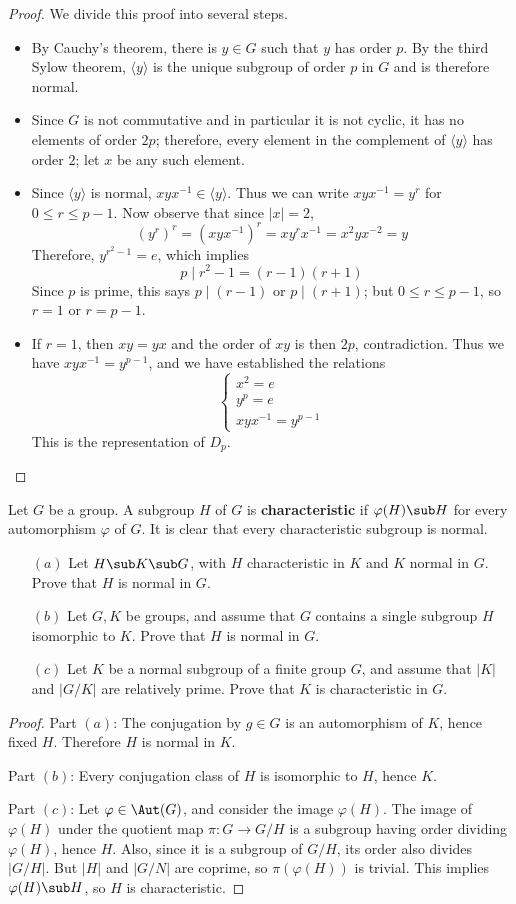 \begin{proof}
We divide this proof into several steps.
\begin{itemize}
\item By Cauchy's theorem, there is $y\in G$ such that $y$ has order $p$. By the third Sylow theorem, $\langle y\rangle$ is the unique subgroup of order $p$ in $G$ and is therefore normal.
\item Since $G$ is not commutative and in particular it is not cyclic, it has no elements of order $2p$; therefore, every element in the complement of $\langle y\rangle$ has order $2$; let $x$ be any such element.
\item Since $\langle y\rangle$ is normal, $xyx^{-1}\in\langle y\rangle$. Thus we can write $xyx^{-1}=y^r$ for $0\leq r\leq p-1$. Now observe that since $|x|=2$,
\[(y^r)^r=(xyx^{-1})^r=xy^rx^{-1}=x^2yx^{-2}=y\]
Therefore, $y^{r^2-1}=e$, which implies
\[p\mid r^2-1=(r-1)(r+1)\]
Since $p$ is prime, this says $p\mid(r-1)$ or $p\mid(r+1)$; but $0\leq r\leq p-1$, so $r=1$ or $r=p-1$.
\item If $r=1$, then $xy=yx$ and the order of $xy$ is then $2p$, contradiction. Thus we have $xyx^{-1}=y^{p-1}$, and we have established the relations
\[\left\{\begin{array}{l}
x^2=e\\
y^p=e\\
xyx^{-1}=y^{p-1}
\end{array}\right. \]
This is the representation of $D_p$.
\end{itemize}
\end{proof}
\begin{exercise}
Let $G$ be a group. A subgroup $H$ of $G$ is \textbf{characteristic} if $\varphi(H)\sub H$ for every automorphism $\varphi$ of $G$. It is clear that every characteristic 
subgroup is normal.
\begin{itemize}
\item[$(a)$] Let $H\sub K\sub G$, with $H$ characteristic in $K$ and $K$ normal in $G$. Prove that $H$ is normal in $G$.
\item[$(b)$] Let $G,K$ be groups, and assume that $G$ contains a single subgroup $H$ isomorphic to $K$. Prove that $H$ is normal in $G$.
\item[$(c)$] Let $K$ be a normal subgroup of a finite group $G$, and assume that $|K|$ and $|G/K|$ are relatively prime. Prove that $K$ is characteristic in $G$.  
\end{itemize}
\end{exercise}
\begin{proof}
Part $(a)$: The conjugation by $g\in G$ is an automorphism of $K$, hence fixed $H$. Therefore $H$ is normal in $K$.\par
Part $(b)$: Every conjugation class of $H$ is isomorphic to $H$, hence $K$.\par
Part $(c)$: Let $\varphi\in\Aut(G)$, and consider the image $\varphi(H)$. The image of $\varphi(H)$ under the quotient map $\pi:G\to G/H$ is a subgroup having order dividing 
$\varphi(H)$, hence $H$. Also, since it is a subgroup of $G/H$, its order also divides $|G/H|$. But $|H|$ and $|G/N|$ are coprime, so $\pi(\varphi(H))$ is trivial. This 
implies $\varphi(H)\sub H$, so $H$ is characteristic.
\end{proof}
